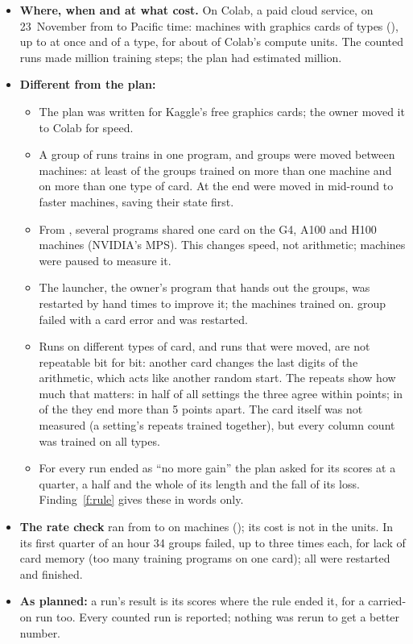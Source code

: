 \documentclass[10pt,letterpaper]{article}
\newcommand{\lead}[1]{\textbf{#1}}               %
\begin{document}
\begin{itemize}
\item \lead{Where, when and at what cost.} On Colab, a paid cloud service, on 23~November from \StageStart{} to
      \StageEnd{} Pacific time: \Machines{} machines with graphics cards of \MachineTypes{} types
      (\MachineList), up to \MachinesAtOnce{} at once and \MachinesPerType{} of a type, for about \ComputeUnits{}
      of Colab's compute units. The
      counted runs made \StepsMillions{} million training steps; the plan had estimated \PlannedSteps{} million.
\item \lead{Different from the plan:}
  \begin{itemize}
  \item The plan was written for Kaggle's free graphics cards; the owner moved it to Colab for speed.
  \item A group of \RunsPerGroup{} runs trains in one program, and groups were moved between machines: at
        least \GroupsOnSeveralMachines{} of the \Groups{} groups trained on more than one machine and
        \GroupsOnSeveralTypes{} on more than one type of card. At the end \MovedLateGroups{} were moved in
        mid-round to faster machines, saving their state first.
  \item From \SharingStart, several programs shared one card on the G4, A100 and H100 machines (NVIDIA's
        MPS). This changes speed, not arithmetic; \MachinesPaused{} machines were paused to measure it.
  \item The launcher, the owner's program that hands out the groups, was restarted by hand
        \LauncherRestarts{} times to improve it; the machines trained on. \GroupFailuresCap{} group failed
        with a card error and was restarted.
  \item Runs on different types of card, and runs that were moved, are not repeatable bit for bit: another
        card changes the last digits of the arithmetic, which acts like another random start. The repeats show
        how much that matters: in half of all settings the three agree within \SpreadMiddle{} points; in
        \SpreadOverFive{} of the \Settings{} they end more than 5 points apart. The card itself was not measured
        (a setting's repeats trained together), but every column count was trained on all \MachineTypes{} types.
  \item For every run ended as ``no more gain'' the plan asked for its scores at a quarter, a half and the
        whole of its length and the fall of its loss. Finding~\ref{f:rule} gives these in words only.
  \end{itemize}
\item \lead{The rate check} ran from \RcStart{} to \RcEnd{} on \RcMachines{} machines (\RcMachineList); its
      cost is not in the \ComputeUnits{} units. In its first quarter of an hour 34 groups failed, up to three times each, for lack
      of card memory (too many training programs on one card); all were restarted and finished.
\item \lead{As planned:} a run's result is its scores where the rule ended it, for a carried-on run too. Every
      counted run is reported; nothing was rerun to get a better number.
\end{itemize}
\end{document}
